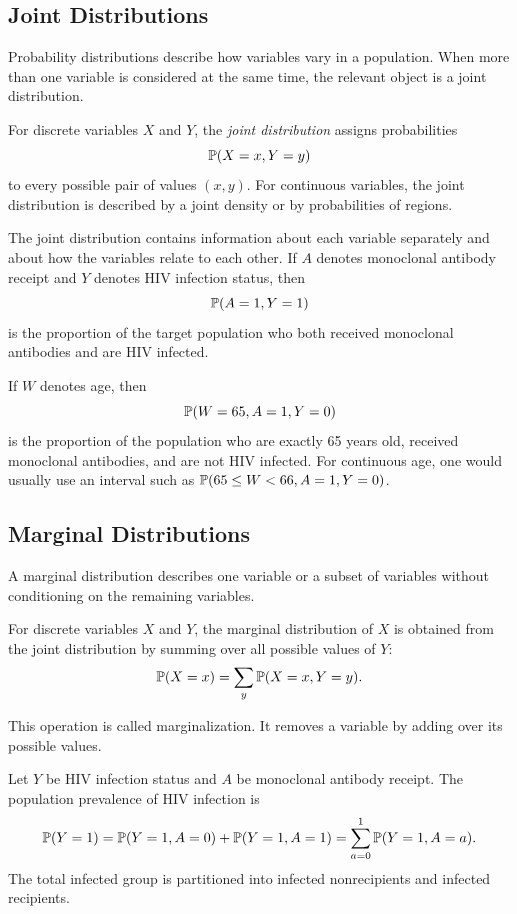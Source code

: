 \label{lec:1-3}

\subsection{Joint Distributions}

Probability distributions describe how variables vary in a population. When more than one variable is considered at the same time, the relevant object is a joint distribution.

\begin{definition}
For discrete variables $X$ and $Y$, the \emph{joint distribution} assigns probabilities
\[
\mathbb{P}(X=x,Y=y)
\]
to every possible pair of values $(x,y)$. For continuous variables, the joint distribution is described by a joint density or by probabilities of regions.
\end{definition}

The joint distribution contains information about each variable separately and about how the variables relate to each other. If $A$ denotes monoclonal antibody receipt and $Y$ denotes HIV infection status, then
\[
\mathbb{P}(A=1,Y=1)
\]
is the proportion of the target population who both received monoclonal antibodies and are HIV infected.

If $W$ denotes age, then
\[
\mathbb{P}(W=65,A=1,Y=0)
\]
is the proportion of the population who are exactly 65 years old, received monoclonal antibodies, and are not HIV infected. For continuous age, one would usually use an interval such as $\mathbb{P}(65\le W<66,A=1,Y=0)$.

\subsection{Marginal Distributions}

A marginal distribution describes one variable or a subset of variables without conditioning on the remaining variables.

\begin{definition}
For discrete variables $X$ and $Y$, the marginal distribution of $X$ is obtained from the joint distribution by summing over all possible values of $Y$:
\[
\mathbb{P}(X=x)=\sum_y \mathbb{P}(X=x,Y=y).
\]
\end{definition}

This operation is called marginalization. It removes a variable by adding over its possible values.

\begin{example}
Let $Y$ be HIV infection status and $A$ be monoclonal antibody receipt. The population prevalence of HIV infection is
\[
\mathbb{P}(Y=1)
=\mathbb{P}(Y=1,A=0)+\mathbb{P}(Y=1,A=1)
=\sum_{a=0}^1 \mathbb{P}(Y=1,A=a).
\]
The total infected group is partitioned into infected nonrecipients and infected recipients.
\end{example}

